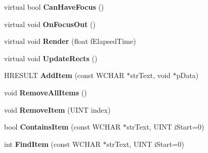 \begin{DoxyCompactItemize}
\item 
\hypertarget{class_c_d_x_u_t_combo_box_a274c5f85816abf1d040ea1606bd3447c}{virtual bool {\bfseries Can\+Have\+Focus} ()}\label{class_c_d_x_u_t_combo_box_a274c5f85816abf1d040ea1606bd3447c}

\item 
\hypertarget{class_c_d_x_u_t_combo_box_a513be57f0d60315b255ef11f5998c268}{virtual void {\bfseries On\+Focus\+Out} ()}\label{class_c_d_x_u_t_combo_box_a513be57f0d60315b255ef11f5998c268}

\item 
\hypertarget{class_c_d_x_u_t_combo_box_a8221628e1ddc7bf2da67c58b30c01f5e}{virtual void {\bfseries Render} (float f\+Elapsed\+Time)}\label{class_c_d_x_u_t_combo_box_a8221628e1ddc7bf2da67c58b30c01f5e}

\item 
\hypertarget{class_c_d_x_u_t_combo_box_a2170bab00045ce0e43f2381d2c5f3648}{virtual void {\bfseries Update\+Rects} ()}\label{class_c_d_x_u_t_combo_box_a2170bab00045ce0e43f2381d2c5f3648}

\item 
\hypertarget{class_c_d_x_u_t_combo_box_aa444c95e8c96e0e16a5184de95cd3bd9}{H\+R\+E\+S\+U\+L\+T {\bfseries Add\+Item} (const W\+C\+H\+A\+R $\ast$str\+Text, void $\ast$p\+Data)}\label{class_c_d_x_u_t_combo_box_aa444c95e8c96e0e16a5184de95cd3bd9}

\item 
\hypertarget{class_c_d_x_u_t_combo_box_a8554b7a381480a1698e283908bb3ebcc}{void {\bfseries Remove\+All\+Items} ()}\label{class_c_d_x_u_t_combo_box_a8554b7a381480a1698e283908bb3ebcc}

\item 
\hypertarget{class_c_d_x_u_t_combo_box_aa2b97d66478fa689d7e05d0e84f227b6}{void {\bfseries Remove\+Item} (U\+I\+N\+T index)}\label{class_c_d_x_u_t_combo_box_aa2b97d66478fa689d7e05d0e84f227b6}

\item 
\hypertarget{class_c_d_x_u_t_combo_box_a1f2a004f544f4ce18603688572594967}{bool {\bfseries Contains\+Item} (const W\+C\+H\+A\+R $\ast$str\+Text, U\+I\+N\+T i\+Start=0)}\label{class_c_d_x_u_t_combo_box_a1f2a004f544f4ce18603688572594967}

\item 
\hypertarget{class_c_d_x_u_t_combo_box_acb2d98d5fa0b8f9984f253dffaea2318}{int {\bfseries Find\+Item} (const W\+C\+H\+A\+R $\ast$str\+Text, U\+I\+N\+T i\+Start=0)}\label{class_c_d_x_u_t_combo_box_acb2d98d5fa0b8f9984f253dffaea2318}


\end{DoxyCompactItemize}
